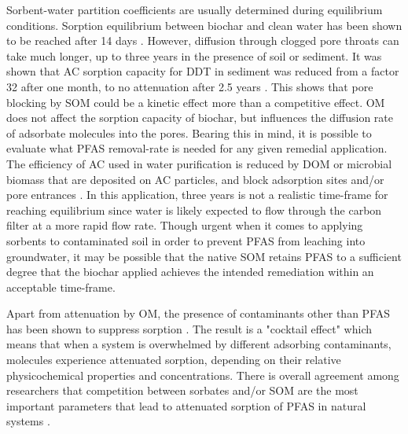 Sorbent-water partition coefficients are usually determined during equilibrium conditions. Sorption equilibrium between biochar and clean water has been shown to be reached after 14 days \citep{Kupryianchyk2016b}. However, diffusion through clogged pore throats can take much longer, up to three years in the presence of soil or sediment. It was shown that AC sorption capacity for DDT in sediment was reduced from a factor 32 after one month, to no attenuation after 2.5 years \citep{hale2009sorption}. This shows that pore blocking by SOM could be a kinetic effect more than a competitive effect. OM does not affect the sorption capacity of biochar, but influences the diffusion rate of adsorbate molecules into the pores. Bearing this in mind, it is possible to evaluate what PFAS removal-rate is needed for any given remedial application. The efficiency of AC used in water purification is reduced by DOM or microbial biomass that are deposited on AC particles, and block adsorption sites and/or pore entrances \citep{Teixido2013}. In this application, three years is not a realistic time-frame for reaching equilibrium since water is likely expected to flow through the carbon filter at a more rapid flow rate. Though urgent when it comes to applying sorbents to contaminated soil in order to prevent PFAS from leaching into groundwater, it may be possible that the native SOM retains PFAS to a sufficient degree that the biochar applied achieves the intended remediation within an acceptable time-frame. 

Apart from attenuation by OM, the presence of contaminants other than PFAS has been shown to suppress sorption \citep{Cornelissen2006}. The result is a "cocktail effect" which means that when a system is overwhelmed by different adsorbing contaminants, molecules experience attenuated sorption, depending on their relative physicochemical properties and concentrations. There is overall agreement among researchers that competition between sorbates and/or SOM are the most important parameters that lead to attenuated sorption of PFAS in natural systems \citep{zareitalabad2013perfluorooctanoic,higgins2006sorption,Teixido2013}. 